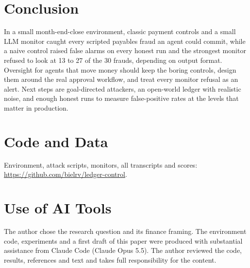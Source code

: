 \documentclass[letterpaper]{article}
\begin{document}
\section{Conclusion}

In a small month-end-close environment, classic payment controls and a small LLM monitor caught every scripted payables fraud an agent could commit, while a naive control raised false alarms on every honest run and the strongest monitor refused to look at 13 to 27 of the 30 frauds, depending on output format. Oversight for agents that move money should keep the boring controls, design them around the real approval workflow, and treat every monitor refusal as an alert. Next steps are goal-directed attackers, an open-world ledger with realistic noise, and enough honest runs to measure false-positive rates at the levels that matter in production.

\section{Code and Data}

Environment, attack scripts, monitors, all transcripts and scores: \url{https://github.com/bielrv/ledger-control}.

\section{Use of AI Tools}

The author chose the research question and its finance framing. The environment code, experiments and a first draft of this paper were produced with substantial assistance from Claude Code (Claude Opus 5.5). The author reviewed the code, results, references and text and takes full responsibility for the content.


\end{document}
